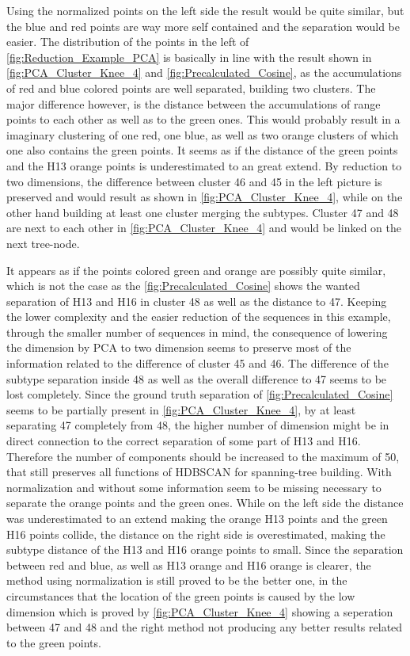 Using the normalized points on the left side the result would be quite similar, but the blue and red points are way more self contained and the separation would be easier. The distribution of the points in the left of \autoref{fig:Reduction_Example_PCA} is basically in line with the result shown in \autoref{fig:PCA_Cluster_Knee_4} and \autoref{fig:Precalculated_Cosine}, as the accumulations of red and blue colored points are well separated, building two clusters. The major difference however, is the distance between the accumulations of range points to each other as well as to the green ones. This would probably result in a imaginary clustering of one red, one blue, as well as two orange clusters of which one also contains the green points. It seems as if the distance of the green points and the H13 orange points is underestimated to an great extend. By reduction to two dimensions, the difference between cluster 46 and 45 in the left picture is preserved and would result as shown in \autoref{fig:PCA_Cluster_Knee_4}, while on the other hand building at least one cluster merging the subtypes. Cluster 47 and 48 are next to each other in \autoref{fig:PCA_Cluster_Knee_4} and would be linked on the next tree-node.

It appears as if the points colored green and orange are possibly quite similar, which is not the case as the \autoref{fig:Precalculated_Cosine} shows the wanted separation of H13 and H16 in cluster 48 as well as the distance to 47. Keeping the lower complexity and the easier reduction of the sequences in this example, through the smaller number of sequences in mind, the consequence of lowering the dimension by \gls{PCA} to two dimension seems to preserve most of the information related to the difference of cluster 45 and 46. The difference of the subtype separation inside 48 as well as the overall difference to 47 seems to be lost completely. Since the ground truth separation of \autoref{fig:Precalculated_Cosine} seems to be partially present in \autoref{fig:PCA_Cluster_Knee_4}, by at least separating 47 completely from 48, the higher number of dimension might be in direct connection to the correct separation of some part of H13 and H16. Therefore the number of components should be increased to the maximum of 50, that still preserves all functions of \gls{HDBSCAN} for spanning-tree building. With normalization and without some information seem to be missing necessary to separate the orange points and the green ones. While on the left side the distance was underestimated to an extend making the orange H13 points and the green H16 points collide, the distance on the right side is overestimated, making the subtype distance of the H13 and H16 orange points to small. Since the separation between red and blue, as well as H13 orange and H16 orange is clearer, the method using normalization is still proved to be the better one, in the circumstances that the location of the green points is caused by the low dimension which is proved by \autoref{fig:PCA_Cluster_Knee_4} showing a seperation between 47 and 48 and the right method not producing any better results related to the green points. 

